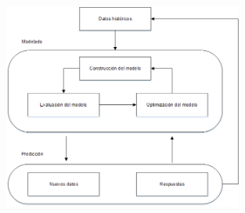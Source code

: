 \begin{figure}[htb]
	\centering
	\includegraphics[width=0.7\textwidth]{03_GraphicFiles/p06.png}
	\label{fig:ml-pipeline}
\end{figure}


